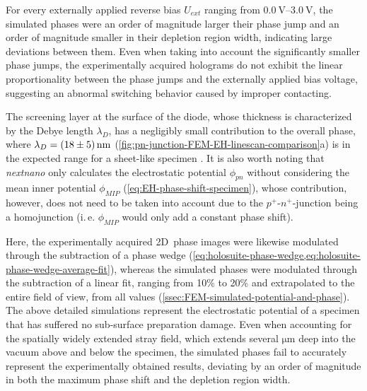 For every externally applied reverse bias $U_{\mathit{ext}}$ ranging from $\SIrange{0.0}{3.0}{\volt}$, the simulated phases were an order of magnitude larger their phase jump and an order of magnitude smaller in their depletion region width, indicating large deviations between them. Even when taking into account the significantly smaller phase jumps, the experimentally acquired holograms do not exhibit the linear proportionality between the phase jumps and the externally applied bias voltage, suggesting an abnormal switching behavior caused by improper contacting.

The screening layer at the surface of the diode, whose thickness is characterized by the Debye length $\lambda_D$, has a negligibly small contribution to the overall phase, where $\lambda_D = \SI{18 \pm 5}{\nm}$ (\cref{fig:pn-junction-FEM-EH-linescan-comparison}a) is in the expected range for a sheet-like specimen \cite{Gurugubelli2015}. It is also worth noting that \emph{nextnano} only calculates the electrostatic potential $\phi_{\mathit{pn}}$ without considering the mean inner potential $\phi_{\mathit{MIP}}$ (\cref{eq:EH-phase-shift-specimen}), whose contribution, however, does not need to be taken into account due to the $p^+$-$n^+$-junction being a homojunction (i.\,e. $\phi_{\mathit{MIP}}$ would only add a constant phase shift).

Here, the experimentally acquired 2D~phase images were likewise modulated through the subtraction of a phase wedge (\cref{eq:holosuite-phase-wedge,eq:holosuite-phase-wedge-average-fit}), whereas the simulated phases were modulated through the subtraction of a linear fit, ranging from 10\% to 20\% and extrapolated to the entire field of view, from all values (\cref{ssec:FEM-simulated-potential-and-phase}).
\newpage
The above detailed simulations represent the electrostatic potential of a specimen that has suffered no sub-surface preparation damage. Even when accounting for the spatially widely extended stray field, which extends several $\si{\um}$ deep into the vacuum above and below the specimen, the simulated phases fail to accurately represent the experimentally obtained results, deviating by an order of magnitude in both the maximum phase shift and the depletion region width.


